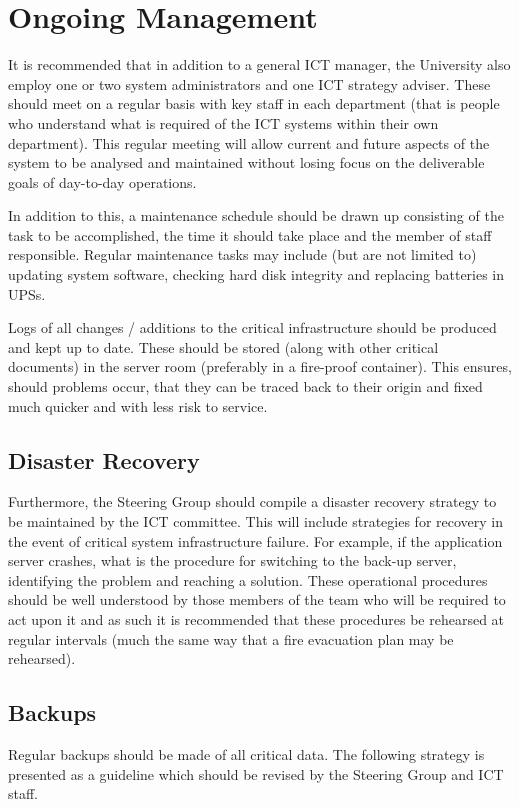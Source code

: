 \documentclass[a4paper, twoside]{article}
\begin{document}
\section{Ongoing Management}
\label{sec:manage}
It is recommended that in addition to a general ICT manager, the University also
employ one or two system administrators and one ICT strategy adviser. These
should meet on a regular basis with key staff in each department (that is people
who understand what is required of the ICT systems within their own department).
This regular meeting will allow current and future aspects of the system to be
analysed and maintained without losing focus on the deliverable goals of
day-to-day operations.

In addition to this, a maintenance schedule should be drawn up consisting of the
task to be accomplished, the time it should take place and the member of staff
responsible. Regular maintenance tasks may include (but are not limited to)
updating system software, checking hard disk integrity and replacing batteries
in UPSs.

Logs of all changes / additions to the critical infrastructure should be produced
and kept up to date. These should be stored (along with other critical
documents) in the server room (preferably in a fire-proof container). This
ensures, should problems occur, that they can be traced back to their origin and
fixed much quicker and with less risk to service.

\subsection{Disaster Recovery}
Furthermore, the Steering Group should compile a disaster recovery strategy to
be maintained by the ICT committee. This will include strategies for recovery in
the event of critical system infrastructure failure. For example, if the
application server crashes, what is the procedure for switching to the back-up
server, identifying the problem and reaching a solution. These operational
procedures should be well understood by those members of the team who will be
required to act upon it and as such it is recommended that these procedures be
rehearsed at regular intervals (much the same way that a fire evacuation plan
may be rehearsed).

\subsection{Backups}
Regular backups should be made of all critical data. The following strategy is
presented as a guideline which should be revised by the Steering Group and ICT
staff.
\end{document}
